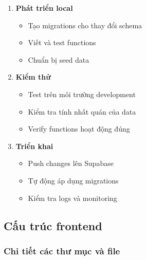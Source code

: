 \documentclass[a4paper]{report}
\begin{document}
\begin{enumerate}
    \item \textbf{Phát triển local}
    \begin{itemize}
        \item Tạo migrations cho thay đổi schema
        \item Viết và test functions
        \item Chuẩn bị seed data
    \end{itemize}

    \item \textbf{Kiểm thử}
    \begin{itemize}
        \item Test trên môi trường development
        \item Kiểm tra tính nhất quán của data
        \item Verify functions hoạt động đúng
    \end{itemize}

    \item \textbf{Triển khai}
    \begin{itemize}
        \item Push changes lên Supabase
        \item Tự động áp dụng migrations
        \item Kiểm tra logs và monitoring
    \end{itemize}
\end{enumerate}

\subsection{Cấu trúc frontend}

\subsubsection{Chi tiết các thư mục và file}
\end{document}
